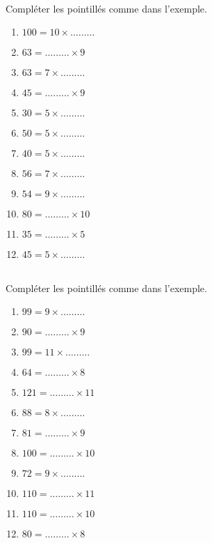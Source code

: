 \exercice \diff[2] \\
Compléter les pointillés comme dans l'exemple.
\begin{multicols}{4}
\begin{enumerate}
\item $100 = 10 \times \ldots\ldots\ldots$
\item $63 = \ldots\ldots\ldots \times 9$
\item $63 = 7 \times \ldots\ldots\ldots$
\item $45 = \ldots\ldots\ldots \times 9$
\item $30 = 5 \times \ldots\ldots\ldots$
\item $50 = 5 \times \ldots\ldots\ldots$
\item $40 = 5 \times \ldots\ldots\ldots$
\item $56 = 7 \times \ldots\ldots\ldots$
\item $54 = 9 \times \ldots\ldots\ldots$
\item $80 = \ldots\ldots\ldots \times 10$
\item $35 = \ldots\ldots\ldots \times 5$
\item $45 = 5 \times \ldots\ldots\ldots$
\end{enumerate}
\end{multicols}

\exercice \diff[3] \\
Compléter les pointillés comme dans l'exemple.
\begin{multicols}{4}
\begin{enumerate}
\item $99 = 9 \times \ldots\ldots\ldots$
\item $90 = \ldots\ldots\ldots \times 9$
\item $99 = 11 \times \ldots\ldots\ldots$
\item $64 = \ldots\ldots\ldots \times 8$
\item $121 = \ldots\ldots\ldots \times 11$
\item $88 = 8 \times \ldots\ldots\ldots$
\item $81 = \ldots\ldots\ldots \times 9$
\item $100 = \ldots\ldots\ldots \times 10$
\item $72 = 9 \times \ldots\ldots\ldots$
\item $110 = \ldots\ldots\ldots \times 11$
\item $110 = \ldots\ldots\ldots \times 10$
\item $80 = \ldots\ldots\ldots \times 8$
\end{enumerate}
\end{multicols}


